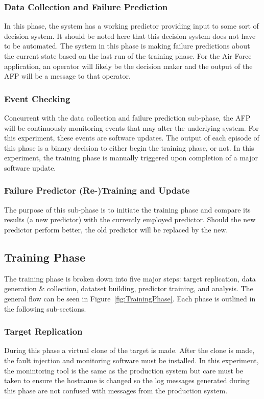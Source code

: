 \subsubsection{Data Collection and Failure Prediction}
In this phase, the system has a working predictor providing input to some sort
of decision system.  It should be noted here that this decision system does not
have to be automated.  The system in this phase is making failure predictions
about the current state based on the last run of the training phase.  For the
Air Force application, an operator will likely be the decision maker and the
output of the AFP will be a message to that operator.  

\subsubsection{Event Checking}
Concurrent with the data collection and failure prediction sub-phase, the AFP
will be continuously monitoring events that may alter the underlying system.
For this experiment, these events are software updates.  The output of each
episode of this phase is a binary decision to either begin the training phase,
or not.  In this experiment, the training phase is manually triggered upon
completion of a major software update.

\subsubsection{Failure Predictor (Re-)Training and Update}
The purpose of this sub-phase is to initiate the training phase and compare its
results (a new predictor) with the currently employed predictor.  Should the
new predictor perform better, the old predictor will be replaced by the new.

\subsection{Training Phase}
The training phase is broken down into five major steps:  target replication,
data generation \& collection, datatset building, predictor training, and
analysis.  The general flow can be seen in Figure~\ref{fig:TrainingPhase}.
Each phase is outlined in the following sub-sections.

\figTrainingPhase

\subsubsection{Target Replication}
During this phase a virtual clone of the target is made.  After the clone is
made, the fault injection and monitoring software must be installed.  In this
experiment, the monintoring tool is the same as the production system but care
must be taken to ensure the hostname is changed so the log messages generated
during this phase are not confused with messages from the production system.

